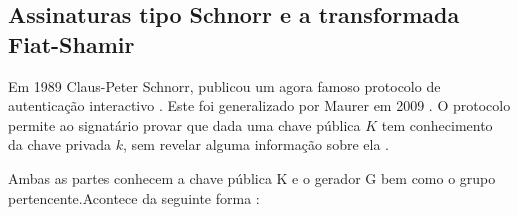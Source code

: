 \begin{enumerate}



\subsection{Assinaturas tipo Schnorr e a transformada Fiat-Shamir} 
\label{sec:schnorr-fiat-shamir}

Em 1989 Claus-Peter Schnorr, publicou um agora famoso protocolo de autenticação interactivo \cite{schnorr-signatures}. Este foi generalizado por Maurer em 2009 \cite{simple-zk-proof-maurer}. O protocolo permite ao signatário provar que dada uma chave pública $K$ tem conhecimento da chave privada $k$, sem revelar alguma informação sobre ela \cite{Signatures2015BorromeanRS}. 

Ambas as partes conhecem a chave pública K e o gerador G bem como o grupo pertencente.\newline Acontece da seguinte forma :
\iffalse
\begin{enumerate}
	\item o provador gera um número aleatório \(\alpha \in_R \mathbb{Z}_l\),
	\item calcula $\alpha G$, e envia $\alpha G$ ao verificador.
	\item O verificador gera um {\em desafio} aleatório $c \in_R \mathbb{Z}_l$  
    \item e envia $c$ ao provador.
    \item O provador calcula a {\em resposta} $r = \alpha + c*k$
    \item e envia $r$ ao verificador.
	\item O verificador calcula $R = r G$ e $R' = \alpha G + c*K$, e verifica se :
$R \stackrel{?}{=} R'$. 
\end{enumerate}
\fi


\end{enumerate}
